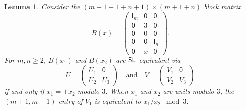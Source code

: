 \documentclass[12pt]{amsbook}%
\newtheorem{lemma}[theor]{Lemma}
\theoremstyle{defin}
\theoremstyle{remark}
\numberwithin{equation}{chapter}
\numberwithin{theor}{section}
\newcommand{\idmatrix}{\mathsf{I}}
\newcommand{\zmatrix}{\mathsf{0}}
\newcommand{\SL}{{\sf SL}}
\begin{document}
\begin{lemma}\label{gunnarprob}
 Consider the $(m+1+1+n+1)\times (m+1+n)$ block matrix
\[
B(x) =
\left( \begin{array}{cc|c}
\idmatrix_{m} & \zmatrix  & \zmatrix \\
\zmatrix & 3 &  \zmatrix \\
\zmatrix & 0  &  \zmatrix\\ \hline
\zmatrix & \zmatrix & \idmatrix_n   \\
\zmatrix & x & \zmatrix
\end{array}
\right).
\]
For $m ,n \geq 2$, $B(x_1)$ and $B(x_2)$ are $\SL$-equivalent via
\[
U=\left(\begin{array}{cc}
U_{1} & \zmatrix \\ 
U_{2} & U_{3}
\end{array}\right) \quad \text{and} \quad 
V=\left(\begin{array}{cc}
V_{1} & \zmatrix \\ 
V_{2} & V_{3}
\end{array}\right)
\]
 if and only if $x_1=\pm x_2$ modulo $3$. When $x_1$ and $x_2$ are units modulo $3$, the $(m+1,m+1)$ entry of $V_1$ is equivalent to $x_1/x_2 \; \bmod 3$.
\end{lemma}
\end{document}
